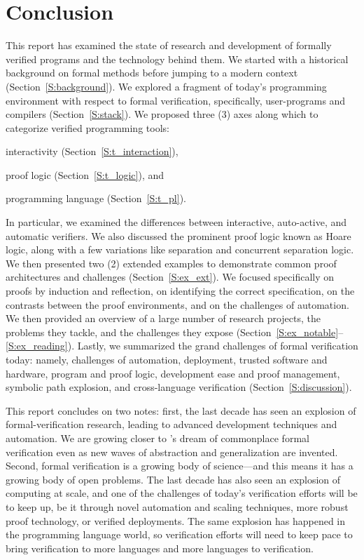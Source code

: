 \section{Conclusion}\label{S:conclusion}

This report has examined the state of research and development of
formally verified programs and the technology behind them. We started with a
historical background on formal methods before jumping to a modern context
(Section~\ref{S:background}). We explored a fragment of today's programming
environment with respect to formal verification, specifically, user-programs and
compilers (Section~\ref{S:stack}). We proposed three (3) axes along which to
categorize verified programming tools:
\begin{inlist}
\item interactivity (Section~\ref{S:t_interaction}),
\item proof logic (Section~\ref{S:t_logic}), and
\item programming language (Section~\ref{S:t_pl}).
\end{inlist}
In particular, we examined the differences between interactive, auto-active, and
automatic verifiers. We also discussed the prominent proof logic known as Hoare
logic, along with a few variations like separation and concurrent separation
logic. We then presented two (2) extended examples to demonstrate common proof
architectures and challenges (Section~\ref{S:ex_ext}). We focused specifically on
proofs by induction and reflection, on identifying the correct specification, on
the contrasts between the proof environments, and on the challenges of
automation. We then provided an overview of a large number of research projects,
the problems they tackle, and the challenges they expose
(Section~\ref{S:ex_notable}--\ref{S:ex_reading}). Lastly, we summarized the grand
challenges of formal verification today: namely, challenges of automation,
deployment, trusted software and hardware, program and proof logic, development
ease and proof management, symbolic path explosion, and cross-language
verification (Section~\ref{S:discussion}).

This report concludes on two notes: first, the last decade has seen an
explosion of formal-verification research, leading to advanced development
techniques and automation. We are growing closer to \citeauthor{EWD:EWD1036}'s
dream of commonplace formal verification even as new waves of abstraction and
generalization are invented. Second, formal verification is a growing body of
science---and this means it has a growing body of open problems. The last decade
has also seen an explosion of computing at scale, and one of the challenges of
today's verification efforts will be to keep up, be it through novel automation
and scaling techniques, more robust proof technology, or verified deployments.
The same explosion has happened in the programming language world, so
verification efforts will need to keep pace to bring verification to more
languages and more languages to verification.

